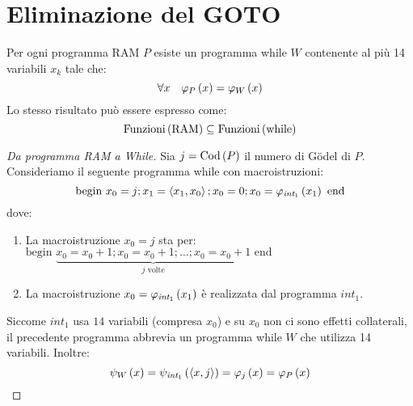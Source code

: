 \documentclass{lectures}
\begin{document}
\section{Eliminazione del GOTO}
\begin{theorem}
    Per ogni programma RAM \(P\) esiste un programma while \(W\) contenente al più 14 variabili \(x_k\) tale che:
    \[
        \forall x \quad \varphi_P\left(x\right) = \varphi_W\left(x\right)
    \]
    Lo stesso risultato può essere espresso come:
    \[
        \text{Funzioni}\left(\text{RAM}\right) \subseteq \text{Funzioni}\left(\text{while}\right)
    \]
\end{theorem}
\begin{proof}[Da programma RAM a While]
    Sia \(j=\text{Cod}\left(P\right)\) il numero di Gödel di \(P\). Consideriamo il seguente programma while con macroistruzioni:
    \[
        \text{begin }x_0 = j; x_1 = \left\langle x_1, x_0\right\rangle; x_0 = 0; x_0 = \varphi_{\textit{int}_1}\left(x_1\right)\text{ end}
    \]
    dove:
    \begin{enumerate}
        \item La macroistruzione \(x_0 = j\) sta per: \(
            \text{begin }\underbrace{x_0 = x_0 +1;x_0 = x_0 +1;\ldots;x_0 = x_0 +1}_{j\text{ volte}}\text{ end}
        \)
        \item La macroistruzione \(x_0 = \varphi_{\textit{int}_1}\left(x_1\right)\) è realizzata dal programma \(\textit{int}_1\).
    \end{enumerate}
    Siccome \(\textit{int}_1\) usa \(14\) variabili (compresa \(x_0\)) e su \(x_0\) non ci sono effetti collaterali, il precedente programma abbrevia un programma while \(W\) che utilizza 14 variabili. Inoltre:
    \[
        \psi_{W}\left(x\right) = \psi_{\textit{int}_1}\left(\left\langle x,j\right\rangle\right) = \varphi_j\left(x\right) = \varphi_P\left(x\right)
    \]
\end{proof}
\clearpage
\end{document}
